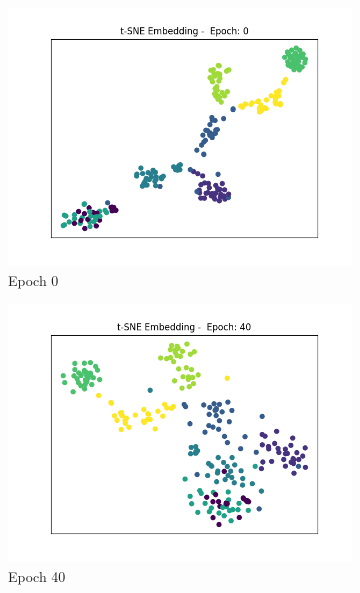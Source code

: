 		\begin{figure}[!ht]
			\centering
			\begin{subfigure}{0.3\textwidth}
				\centering
				\includegraphics[width=1.1\linewidth]{images/plotE6_tSNE_e0_MSRC_9_E_GDL_22_00h-05mExp3pull}
				\caption{Epoch 0}
				\label{fig:plote6tsnee0msrc9egdl2200h-05mexp3pull}
			\end{subfigure}		
			\begin{subfigure}{0.3\textwidth}
				\centering
				\includegraphics[width=1.1\linewidth]{images/plotE6_tSNE_e40_MSRC_9_E_GDL_22_00h-05mExp3pull}
				\caption{Epoch 40}
				\label{fig:plote6tsnee40msrc9egdl2200h-05mexp3pull}
			\end{subfigure}
			\begin{subfigure}{0.3\textwidth}

\end{subfigure}
\end{figure}
